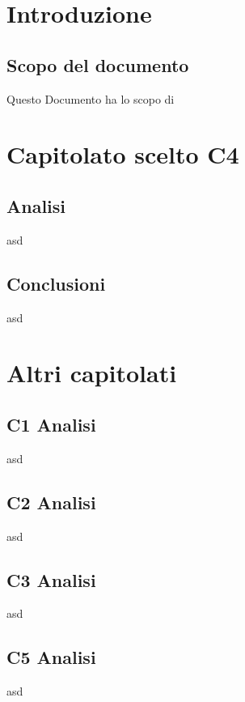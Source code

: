 
\section{Introduzione}
\subsection{Scopo del documento}
Questo Documento ha lo scopo di\\

\section{Capitolato scelto C4}
\subsection{Analisi}
asd\\
\subsection{Conclusioni}
asd\\

\section{Altri capitolati}
\subsection{C1 Analisi}
asd\\
\subsection{C2 Analisi}
asd\\
\subsection{C3 Analisi}
asd\\
\subsection{C5 Analisi}
asd\\
